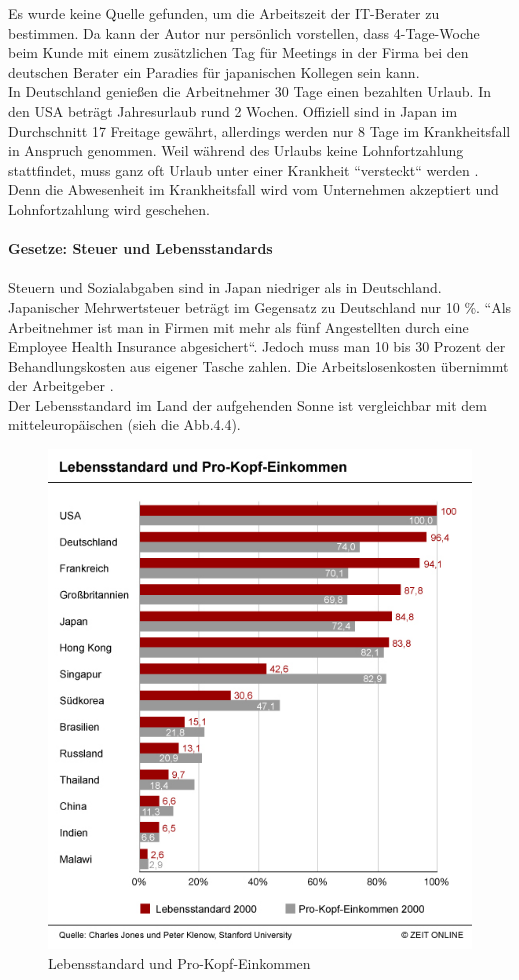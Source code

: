 	Es wurde keine Quelle gefunden, um die Arbeitszeit der IT-Berater zu bestimmen. Da kann der Autor nur persönlich vorstellen, dass 4-Tage-Woche beim Kunde mit einem zusätzlichen Tag für Meetings in der Firma bei den deutschen Berater ein Paradies für japanischen Kollegen sein kann. \\
	In Deutschland genießen die Arbeitnehmer 30 Tage einen bezahlten Urlaub. In den USA beträgt Jahresurlaub rund 2 Wochen. Offiziell sind in Japan im Durchschnitt 17 Freitage gewährt, allerdings werden nur 8 Tage im Krankheitsfall in Anspruch genommen. Weil während des Urlaubs keine Lohnfortzahlung stattfindet, muss ganz oft Urlaub unter einer Krankheit ``versteckt`` werden \cite{JPArbeitSozKultur}. Denn die Abwesenheit im Krankheitsfall wird vom Unternehmen akzeptiert und Lohnfortzahlung wird geschehen.\\
	\\
		\textbf{Gesetze: Steuer und Lebensstandards}\\
		\\
		Steuern und Sozialabgaben sind in Japan niedriger als in Deutschland. Japanischer Mehrwertsteuer beträgt im Gegensatz zu Deutschland nur 10 \%.
		``Als Arbeitnehmer ist man in Firmen mit mehr als fünf Angestellten durch eine Employee Health Insurance abgesichert``. Jedoch muss man 10 bis 30 Prozent der Behandlungskosten aus eigener Tasche zahlen. Die Arbeitslosenkosten übernimmt der Arbeitgeber \cite{ArbZeitJP}.
		\\Der Lebensstandard im Land der aufgehenden Sonne ist vergleichbar mit dem mitteleuropäischen (sieh die Abb.4.4).
		\begin{figure}[ht]
		\centering
		\includegraphics[width=0.7\linewidth]{./images/Lebensstandard-Pro-Kopf-Einkommen}
		\caption{Lebensstandard und Pro-Kopf-Einkommen \cite{LebensStd}}
		\label{fig:LebStdProKEink}
		\end{figure}\\
